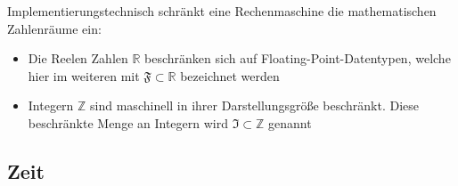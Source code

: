 Implementierungstechnisch schränkt eine Rechenmaschine die mathematischen Zahlenräume ein:
\begin{itemize}
\item Die Reelen Zahlen $\mathbb{R}$ beschränken sich auf Floating-Point-Datentypen, welche hier im weiteren mit $\mathfrak{F} \subset \mathbb{R}$ bezeichnet werden
\item Integern $\mathbb{Z}$ sind maschinell in ihrer Darstellungsgröße beschränkt. Diese beschränkte Menge an Integern wird $\mathfrak{I} \subset \mathbb{Z}$ genannt
\end{itemize}


\subsection{Zeit}
\label{sec:time}
\def\finite#1{\ooalign{\hfil$\mapstochar\mkern 3mu\mapstochar\mkern 5mu$\hfil\cr$#1$}}

